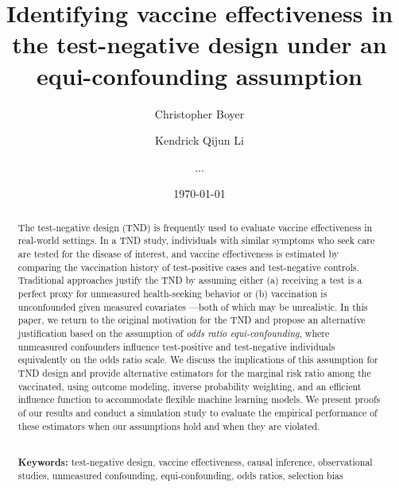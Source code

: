 \documentclass[11pt]{article}
\begin{document}
\begin{titlepage}
\title{Identifying vaccine effectiveness in the test-negative design under an equi-confounding assumption}
\author[1]{Christopher Boyer}%
\author[2]{Kendrick Qijun Li}
\author[3]{...}
\date{\today\vspace{-1em}}
\maketitle

\begin{abstract}
    The test-negative design (TND) is frequently used to evaluate vaccine effectiveness in real-world settings. In a TND study, individuals with similar symptoms who seek care are tested for the disease of interest, and vaccine effectiveness is estimated by comparing the vaccination history of test-positive cases and test-negative controls. Traditional approaches justify the TND by assuming either (a) receiving a test is a perfect proxy for unmeasured health-seeking behavior or (b) vaccination is unconfounded given measured covariates ---both of which may be unrealistic. In this paper, we return to the original motivation for the TND and propose an alternative justification based on the assumption of \textit{odds ratio equi-confounding}, where unmeasured confounders influence test-positive and test-negative individuals equivalently on the odds ratio scale. We discuss the implications of this assumption for TND design and provide alternative estimators for the marginal risk ratio among the vaccinated, using outcome modeling, inverse probability weighting, and an efficient influence function to accommodate flexible machine learning models. We present proofs of our results and conduct a simulation study to evaluate the empirical performance of these estimators when our assumptions hold and when they are violated.

\noindent \\
\noindent\textbf{Keywords:} test-negative design, vaccine effectiveness, causal inference, observational studies, unmeasured confounding, equi-confounding, odds ratios, selection bias
\bigskip
\end{abstract}
\setcounter{page}{0}
\thispagestyle{empty}
\end{titlepage}
\pagebreak \newpage
\end{document}

